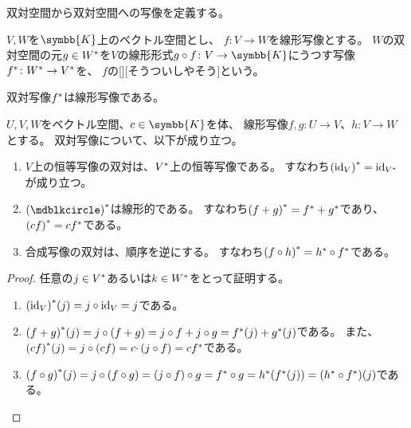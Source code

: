 \documentclass[../sotsu.tex]{subfiles}
\begin{document}
双対空間から双対空間への写像を定義する。

\begin{definition}
    \label{dfn:dual-map}
    $V, W$を$\symbb{K}$上のベクトル空間とし、
    $f \colon V \to W$を線形写像とする。
    $W$の双対空間の元$g \in {W}^*$を$V$の線形形式$g \circ f \colon V \to \symbb{K}$にうつす写像
    ${f}^* \colon {W}^* \to {V}^*$を、
    $f$の[][そうついしやそう]という\cite[\S 4.3]{saito-lin-2007}。
\end{definition}

双対写像${f}^*$は線形写像である\cite[\S 4.3]{saito-lin-2007}。

\begin{proposition}
    \label{thm:dual-map-property}
    $U, V, W$をベクトル空間、$c \in \symbb{K}$を体、
    線形写像$f, g \colon U \to V$、$h \colon V \to W$とする。
    双対写像について、以下が成り立つ\cite[\S 4.3]{saito-lin-2007}。
    \begin{enumerate}
        \item $V$上の恒等写像の双対は、${V}^*$上の恒等写像である。
            すなわち${(\mathrm{id}_V)}^* = \mathrm{id}_{{V}^*}$が成り立つ。
        \item $\dual{(\bigdot)}$は線形的である。
            すなわち${(f + g)}^* = {f}^* + {g}^*$であり、${(cf)}^* = c{f}^*$である。
        \item 合成写像の双対は、順序を逆にする。
            すなわち${(f \circ h)}^* = {h}^* \circ {f}^*$である。
    \end{enumerate}
\end{proposition}

\begin{proof}
    任意の$j \in {V}^*$あるいは$k \in {W}^*$をとって証明する。
    \begin{enumerate}
        \item ${(\mathrm{id}_V)}^*(j) = j \circ \mathrm{id}_V = j$である。
        \item ${(f + g)}^*(j) = j \circ (f + g) = j \circ f + j \circ g = {f}^*(j) + {g}^*(j)$である。
            また、${(cf)}^*(j) = j \circ (cf) = c \cdotp (j \circ f) = c{f}^*$である。
        \item \(
            {(f \circ g)}^*(j) = j \circ (f \circ g) = (j \circ f) \circ g = {f}^* \circ g 
                = {h}^*( {f}^*(j) ) = ({h}^* \circ {f}^*)(j)
            \)である。
    \end{enumerate}
\end{proof}
\end{document}
